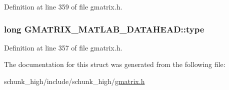 Definition at line 359 of file gmatrix.\-h.

\hypertarget{structGMATRIX__MATLAB__DATAHEAD_a20df828adf57355259f96b10f8f7a1ab}{
\subsubsection[{type}]{\setlength{\rightskip}{0pt plus 5cm}long G\-M\-A\-T\-R\-I\-X\-\_\-\-M\-A\-T\-L\-A\-B\-\_\-\-D\-A\-T\-A\-H\-E\-A\-D\-::type}}\label{structGMATRIX__MATLAB__DATAHEAD_a20df828adf57355259f96b10f8f7a1ab}


Definition at line 357 of file gmatrix.\-h.



The documentation for this struct was generated from the following file\-:\begin{DoxyCompactItemize}
\item 
schunk\-\_\-high/include/schunk\-\_\-high/\hyperlink{gmatrix_8h}{gmatrix.\-h}\end{DoxyCompactItemize}
